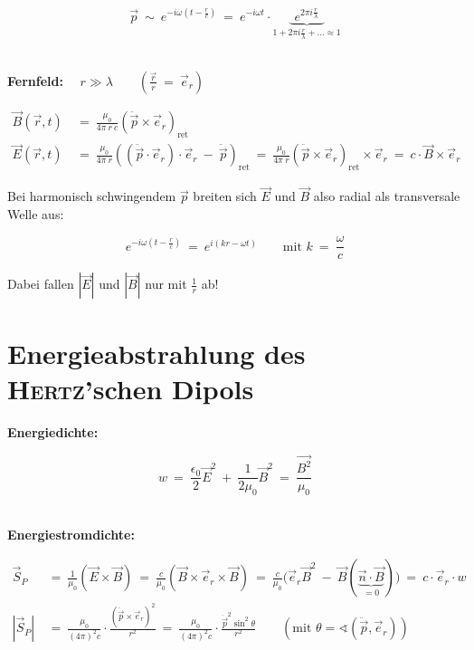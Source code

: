 \begin{enumerate}
\begin{equation*}
\vec{p} \ \sim \ e^{-i\omega\left(t-\frac{r}{c}\right)}  \ = \ e^{-i\omega t} \cdot \underbrace{\; e^{2\pi i \frac{r}{\lambda}}\;}_{1+2\pi i \frac{r}{\lambda}+\ldots \approx 1}
\end{equation*}

\ \\
\textbf{Fernfeld:} $\quad r \gg \lambda \qquad\left(\frac{\vec{r}}{r} \ = \ \vec{e}_r\right)$

\begin{align*}	
\vec{B}(\vec{r},t)  \ &= \ \frac{\mu_0}{4\pi \ r \ c} \left(\ddot{\vec{p}}\times\vec{e}_r\right)_{\text{ret}}\\
\vec{E}(\vec{r},t)  \ &= \ \frac{\mu_0}{4\pi \ r} \left(\left(\ddot{\vec{p}}\cdot\vec{e}_r\right)\cdot\vec{e}_r \ - \ \ddot{\vec{p}}\right)_{\text{ret}}  \ = \ \frac{\mu_0}{4\pi \ r}\left(\ddot{\vec{p}}\times\vec{e}_r\right)_{\text{ret}}\times\vec{e}_r  \ = \ c\cdot\vec{B}\times\vec{e}_r
\end{align*}

Bei harmonisch schwingendem $\vec{p}$ breiten sich $\vec{E}$ und $\vec{B}$ also radial als transversale Welle aus:

\begin{equation*}
e^{-i\omega\left(t-\frac{r}{c}\right)}  \ = \ e^{i(kr-\omega t)} \qquad \text{mit } k  \ = \  \frac{\omega}{c}
\end{equation*}

Dabei fallen $|\vec{E}|$ und $|\vec{B}|$ nur mit $\frac{1}{r}$ ab!
\end{enumerate}


\section{Energieabstrahlung des \textsc{Hertz}'schen Dipols}

\textbf{Energiedichte:}

\begin{equation*}
w  \ = \ \frac{\epsilon_0}{2} \vec{E}^2  \ +  \ \frac{1}{2\mu_0} \vec{B}^2  \ = \ \frac{\vec{B^2}}{\mu_0}
\end{equation*}

\ \\
\textbf{Energiestromdichte:}

\begin{align*}
\vec{S}_P  \ &= \ \frac{1}{\mu_0} (\vec{E}\times\vec{B})  \ = \ \frac{c}{\mu_0} (\vec{B}\times\vec{e}_r\times\vec{B})  \ = \  \frac{c}{\mu_0}\Big(\vec{e}_r\vec{B}^2 \ - \ \vec{B}(\underbrace{\vec{n}\cdot\vec{B}}_{=0})\Big)  \ = \ c\cdot\vec{e}_r\cdot w\\
|\vec{S}_P|  \ &= \ \frac{\mu_0}{(4\pi)^2c}\cdot \frac{\left(\ddot{\vec{p}}\times\vec{e}_r\right)^2}{r^2} \ = \ \frac{\mu_0}{(4\pi)^2c}\cdot\frac{\ddot{\vec{p}}^2\sin^2\theta}{r^2} \qquad \left(\text{mit } \theta = \sphericalangle(\ddot{\vec{p}},\vec{e}_r)\right)
\end{align*}

